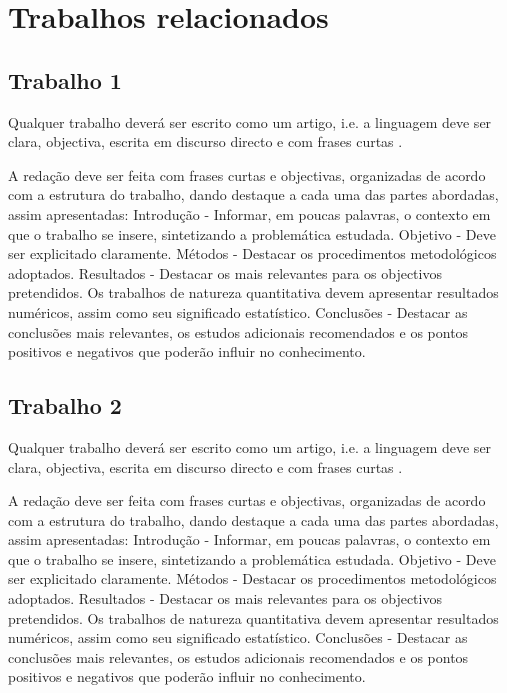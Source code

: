 % 
%  
%
\chapter{Trabalhos relacionados}
\label{cha:SimilarWork}

\section{Trabalho 1}
Qualquer trabalho deverá ser escrito como um artigo, i.e. a linguagem deve ser clara, objectiva, escrita em discurso directo e com frases curtas \cite{gustavii2016write, glasman2010science}.

A redação deve ser feita com frases curtas e objectivas, organizadas de acordo com a estrutura do trabalho, dando destaque a cada uma das partes abordadas, assim apresentadas: Introdução - Informar, em poucas palavras, o contexto em que o trabalho se insere, sintetizando a problemática estudada. Objetivo - Deve ser explicitado claramente. Métodos - Destacar os procedimentos metodológicos adoptados. Resultados - Destacar os mais relevantes para os objectivos pretendidos. Os trabalhos de natureza quantitativa devem apresentar resultados numéricos, assim como seu significado estatístico. Conclusões - Destacar as conclusões mais relevantes, os estudos adicionais recomendados e os pontos positivos e negativos que poderão influir no conhecimento. 


\section{Trabalho 2}
Qualquer trabalho deverá ser escrito como um artigo, i.e. a linguagem deve ser clara, objectiva, escrita em discurso directo e com frases curtas \cite{gustavii2016write, glasman2010science}.

A redação deve ser feita com frases curtas e objectivas, organizadas de acordo com a estrutura do trabalho, dando destaque a cada uma das partes abordadas, assim apresentadas: Introdução - Informar, em poucas palavras, o contexto em que o trabalho se insere, sintetizando a problemática estudada. Objetivo - Deve ser explicitado claramente. Métodos - Destacar os procedimentos metodológicos adoptados. Resultados - Destacar os mais relevantes para os objectivos pretendidos. Os trabalhos de natureza quantitativa devem apresentar resultados numéricos, assim como seu significado estatístico. Conclusões - Destacar as conclusões mais relevantes, os estudos adicionais recomendados e os pontos positivos e negativos que poderão influir no conhecimento.

